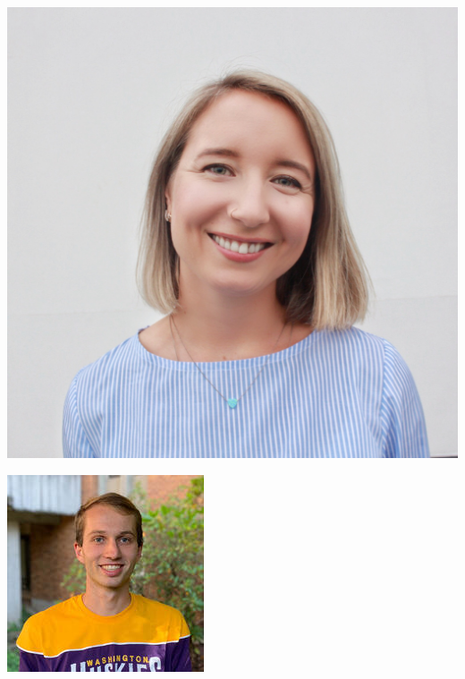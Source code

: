\documentclass{beamer}
\begin{document}
\begin{frame}
\begin{center}
\begin{minipage}{0.24\linewidth}
	\end{minipage}
	\begin{minipage}{0.24\linewidth}
		\includegraphics[width=\linewidth,height=\linewidth]{Figures/anyamikhaylova.jpg}
	\end{minipage}
	\hfill
	\begin{minipage}{0.24\linewidth}
		\includegraphics[width=\linewidth,height=\linewidth]{Figures/seth-temple.jpeg}
	\end{minipage}
\end{center}


\end{frame}
\end{document}
